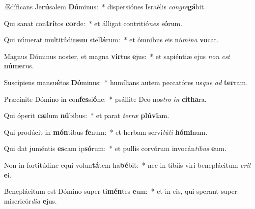 \item Ædíficans Je\textbf{rú}salem \textbf{Dó}minus:~* dispersiónes Israélis \textit{con}\textit{gre}\textbf{gá}bit.
\item Qui sanat con\textbf{trí}tos \textbf{cor}de:~* et álligat contritió\textit{nes} \textit{e}\textbf{ó}rum.
\item Qui númerat multitúdi\textbf{nem} stel\textbf{lá}rum:~* et ómnibus eis nó\textit{mi}\textit{na} \textbf{vo}cat.
\item Magnus Dóminus noster, et magna \textbf{vir}tus \textbf{e}jus:~* et sapiéntiæ ejus \textit{non} \textit{est} \textbf{nú}\textbf{me}rus.
\item Suscípiens mansu\textbf{é}tos \textbf{Dó}minus:~* humílians autem peccatóres us\textit{que} \textit{ad} \textbf{ter}ram.
\item Præcínite Dómino in con\textbf{fes}si\textbf{ó}ne:~* psállite Deo nos\textit{tro} \textit{in} \textbf{cí}\textbf{tha}ra.
\item Qui óperit \textbf{cæ}lum \textbf{nú}bibus:~* et parat \textit{ter}\textit{ræ} \textbf{plú}\textbf{vi}am.
\item Qui prodúcit in \textbf{món}tibus \textbf{fe}num:~* et herbam servi\textit{tú}\textit{ti} \textbf{hó}\textbf{mi}num.
\item Qui dat juméntis \textbf{es}cam ip\textbf{só}rum:~* et pullis corvórum invocán\textit{ti}\textit{bus} \textbf{e}um.
\item Non in fortitúdine equi volun\textbf{tá}tem ha\textbf{bé}bit:~* nec in tíbiis viri beneplácitum \textit{e}\textit{rit} \textbf{e}i.
\item Beneplácitum est Dómino super ti\textbf{mén}tes \textbf{e}um:~* et in eis, qui sperant super misericór\textit{di}\textit{a} \textbf{e}jus.
